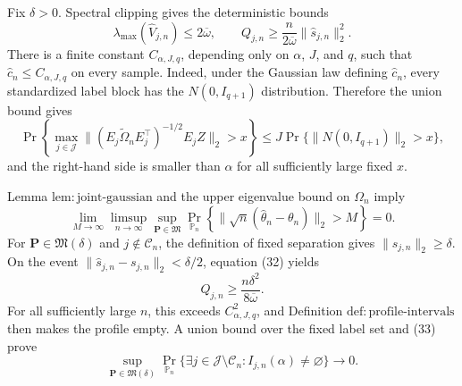 Fix \(\delta>0\).  Spectral clipping gives the deterministic bounds
\[
 \lambda_{\max}(\widehat V_{j,n})\le2\overline\omega,
 \qquad
 Q_{j,n}\ge\frac n{2\overline\omega}
                 \|\widehat s_{j,n}\|_2^2.
\tag{32}
\]
There is a finite constant \(C_{\alpha,J,q}\), depending only on \(\alpha\), \(J\), and \(q\), such that \(\widehat c_n\le C_{\alpha,J,q}\) on every sample.  Indeed, under the Gaussian law defining \(\widehat c_n\), every standardized label block has the \(N(0,I_{q+1})\) distribution.  Therefore the union bound gives
\[
 \Pr\left\{
  \max_{j\in\mathcal J}
  \|(E_j\widetilde\Omega_nE_j^{\top})^{-1/2}E_jZ\|_2>x
 \right\}
 \le J\Pr\{\|N(0,I_{q+1})\|_2>x\},
\]
and the right-hand side is smaller than \(\alpha\) for all sufficiently large fixed \(x\).

Lemma \(\mathrm{lem:joint\text{-}gaussian}\) and the upper eigenvalue bound on \(\Omega_n\) imply
\[
 \lim_{M\to\infty}\limsup_{n\to\infty}
 \sup_{\mathbf P\in\mathfrak M}
 \Pr_{\mathbb P_n}\!\left\{
 \|\sqrt n(\widehat\theta_n-\theta_n)\|_2>M
 \right\}=0.
\tag{33}
\]
For \(\mathbf P\in\mathfrak M(\delta)\) and \(j\notin\mathcal C_n\), the definition of fixed separation gives \(\|s_{j,n}\|_2\ge\delta\).  On the event
\(
 \|\widehat s_{j,n}-s_{j,n}\|_2<\delta/2
\), equation (32) yields
\[
 Q_{j,n}\ge\frac{n\delta^2}{8\overline\omega}.
\]
For all sufficiently large \(n\), this exceeds \(C_{\alpha,J,q}^2\), and Definition \(\mathrm{def:profile\text{-}intervals}\) then makes the profile empty.  A union bound over the fixed label set and (33) prove
\[
 \sup_{\mathbf P\in\mathfrak M(\delta)}
 \Pr_{\mathbb P_n}\{\exists j\in\mathcal J\setminus\mathcal C_n:
 I_{j,n}(\alpha)\ne\varnothing\}\longrightarrow0.
\tag{34}
\]

